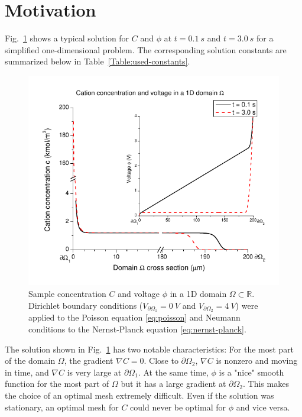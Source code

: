 \section{Motivation} \label{sec:moti}
Fig.~\ref{fig:comsol-conc-volt} shows a typical solution for $C$ and $\phi$
at $t=0.1\ s$ and $t=3.0\ s$ for a simplified one-dimensional problem. The corresponding solution
constants are summarized below in Table~\ref{Table:used-constants}.\begin{figure}[!ht]
  \begin{centering}
      \includegraphics[]{comsol_conc_volt}
  \caption{Sample concentration $C$ and voltage $\phi$
           in a 1D domain $\Omega\subset\mathbb{R}$.
           Dirichlet boundary conditions ($V_{\partial \Omega_1}=0\ V$
           and $V_{\partial \Omega_2}=4\ V$) were
	   applied to the Poisson equation \eqref{eq:poisson} and Neumann conditions
	   to the Nernst-Planck equation \eqref{eq:nernst-planck}.}
\label{fig:comsol-conc-volt}
  \end{centering}
\end{figure}

The solution shown in Fig.~\ref{fig:comsol-conc-volt} has 
two notable characteristics: For the most part of the domain $\Omega$,
the gradient $\nabla C = 0$. Close to $\partial \Omega_2$, $\nabla C$ is
nonzero and moving in time, and $\nabla C$ is very large at $\partial \Omega_1$.
At the same time, $\phi$ is a "nice" smooth function for the most part of 
$\Omega$ but it has a large gradient at $\partial \Omega_2$.
This makes the choice of an optimal mesh extremely difficult. Even if the 
solution was stationary, an optimal mesh for $C$ could never be 
optimal for $\phi$ and vice versa.

